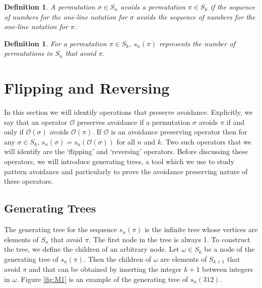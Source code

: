 \documentclass[11pt,letterpaper,twoside,english]{article}
\theoremstyle{theorem}
\newtheorem{definition}[theorem]{Definition}
\theoremstyle{remark}
\newtheorem{remark}{Remark}
\begin{document}

\begin{definition} 
A permutation $\sigma\in S_n$ avoids a permutation $\pi\in S_k$ if the sequence of numbers for the one-line notation for $\sigma$ avoids the sequence of numbers for the one-line notation for $\pi$.
\end{definition}

\begin{definition}
For a permutation $\pi\in S_k$, $s_n(\pi)$ represents the number of permutations in $S_n$ that avoid $\pi$. 
\end{definition}



\section{Flipping and Reversing}

In this section we will identify operations that preserve avoidance. Explicitly, we say that an operator $\mathcal{O}$ preserves avoidance if a permutation $\sigma$ avoids $\pi$ if and only if $\mathcal{O}(\sigma)$ avoids $\mathcal{O}(\pi)$. If $\mathcal{O}$ is an avoidance preserving operator then for any $\sigma\in S_k$, $s_n(\sigma)=s_n(\mathcal{O}(\sigma))$ for all $n$ and $k$. Two such operators that we will identify are the `flipping' and `reversing' operators.  Before discussing these operators, we will introduce generating trees, a tool which we use to study pattern avoidance and particularly to prove the avoidance preserving nature of these operators. 

\subsection{Generating Trees}

The generating tree for the sequence $s_n(\pi)$ is the infinite tree whose vertices are elements of $S_n$ that avoid $\pi$. The first node in the tree is always 1. To construct the tree, we define the children of an arbitrary node. Let $\omega\in S_k$ be a node of the generating tree of $s_n(\pi)$. Then the children of $\omega$ are elements of $S_{k+1}$ that avoid $\pi$ and that can be obtained by inserting the integer $k+1$ between integers in $\omega$. Figure \ref{fig:M1} is an example of the generating tree of $s_n(312)$. 
\end{document}
